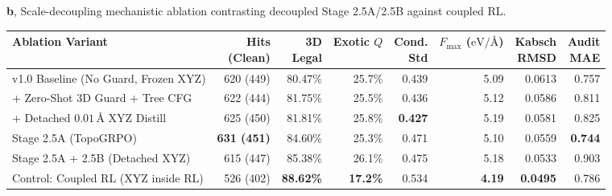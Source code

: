 \documentclass[11pt,a4paper]{article}
\begin{document}
\begin{table}[!h]
  \vspace{5pt}
  \textbf{b}, Scale-decoupling mechanistic ablation contrasting decoupled Stage 2.5A/2.5B against coupled RL.\\[2pt]
  \begin{tabular}{lrrrrrrr}
    \toprule
    Ablation Variant & \shortstack[r]{Hits\\(Clean)} & \shortstack[r]{3D\\Legal} & \shortstack[r]{Exotic\\$Q$} & \shortstack[r]{Cond.\\Std} & \shortstack[r]{$F_{\max}$\\($\text{eV}/\text{\AA}$)} & \shortstack[r]{Kabsch\\RMSD} & \shortstack[r]{Audit\\MAE} \\
    \midrule
    v1.0 Baseline (No Guard, Frozen XYZ) & 620 (449) & 80.47\% & 25.7\% & 0.439 & 5.09 & 0.0613 & 0.757 \\
    + Zero-Shot 3D Guard + Tree CFG & 622 (444) & 81.75\% & 25.5\% & 0.436 & 5.12 & 0.0586 & 0.811 \\
    + Detached $0.01\,\text{\AA}$ XYZ Distill & 625 (450) & 81.81\% & 25.8\% & \textbf{0.427} & 5.19 & 0.0581 & 0.825 \\
    Stage 2.5A (TopoGRPO) & \textbf{631 (451)} & 84.60\% & 25.3\% & 0.471 & 5.10 & 0.0559 & \textbf{0.744} \\
    Stage 2.5A + 2.5B (Detached XYZ) & 615 (447) & 85.38\% & 26.1\% & 0.475 & 5.18 & 0.0533 & 0.903 \\
    Control: Coupled RL (XYZ inside RL) & 526 (402) & \textbf{88.62\%} & \textbf{17.2\%} & 0.534 & \textbf{4.19} & \textbf{0.0495} & 0.786 \\
    \bottomrule
  \end{tabular}
\end{table}
\end{document}
